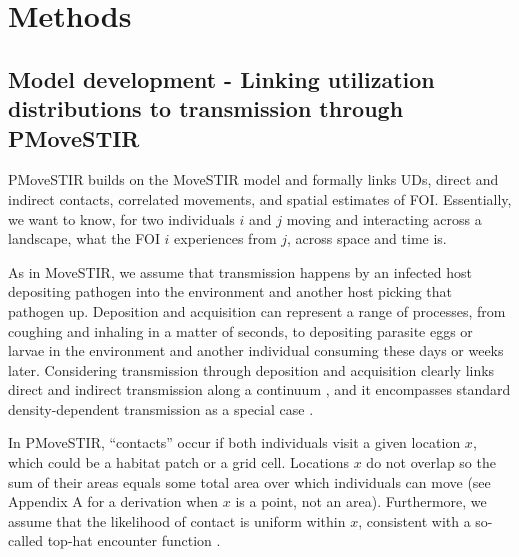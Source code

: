 ﻿\documentclass[11pt]{article}
\begin{document}
\section*{Methods}

\subsection*{Model development - Linking utilization distributions to transmission through PMoveSTIR}

PMoveSTIR builds on the MoveSTIR model \citep{Wilber2022} and formally links UDs, direct and indirect contacts, correlated movements, and spatial estimates of FOI. Essentially, we want to know, for two individuals $i$ and $j$ moving and interacting across a landscape, what the FOI $i$ experiences from $j$, across space and time is.  

As in MoveSTIR, we assume that transmission happens by an infected host depositing pathogen into the environment and another host picking that pathogen up. 
Deposition and acquisition can represent a range of processes, from coughing and inhaling in a matter of seconds, to depositing parasite eggs or larvae in the environment and another individual consuming these days or weeks later. 
Considering transmission through deposition and acquisition clearly links direct and indirect transmission along a continuum \citep{Wilber2022}, and it encompasses standard density-dependent transmission as a special case \citep{Cortez2021}. 

In PMoveSTIR, ``contacts'' occur if both individuals visit a given location $x$, which could be a habitat patch or a grid cell. 
Locations $x$ do not overlap so the sum of their areas equals some total area over which individuals can move (see Appendix A for a derivation when $x$ is a point, not an area). 
Furthermore, we assume that the likelihood of contact is uniform within $x$, consistent with a so-called top-hat encounter function \citep{Gurarie2013,Wilber2022}.
\end{document}
